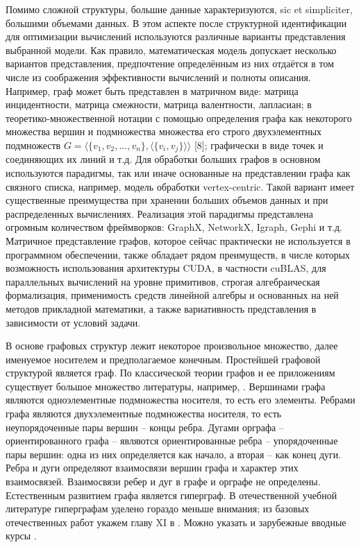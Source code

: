 Помимо сложной структуры, большие данные характеризуются, sic et simpliciter, большими объемами данных. В этом аспекте после структурной идентификации для оптимизации вычислений используются различные варианты представления выбранной модели. Как правило, математическая модель допускает несколько вариантов представления, предпочтение определённым из них отдаётся в том числе из соображения эффективности вычислений и полноты описания. Например, граф может быть представлен в матричном виде: матрица инцидентности, матрица смежности, матрица валентности, лапласиан; в теоретико-множественной нотации с помощью определения графа как некоторого множества вершин и подмножества множества его строго двухэлементных подмножеств $G=\big\langle \{v_1, v_2,...,v_n\},\langle \{v_i, v_j\} \rangle \big\rangle$ [8]; графически в виде точек и соединяющих их линий и т.д. Для обработки больших графов в основном используются парадигмы, так или иначе основанные на представлении графа как связного списка, например, модель обработки vertex-centric. Такой вариант имеет существенные преимущества при хранении больших объемов данных и при распределенных вычислениях. Реализация этой парадигмы представлена огромным количеством фреймворков: GraphX, NetworkX, Igraph, Gephi и т.д. Матричное представление графов, которое сейчас практически не используется в программном обеспечении, также обладает рядом преимуществ, в числе которых возможность использования архитектуры CUDA, в частности cuBLAS, для параллельных вычислений на уровне примитивов, строгая алгебраическая формализация, применимость средств линейной алгебры и основанных на ней методов прикладной математики, а также вариативность представления в зависимости от условий задачи.


В основе графовых структур лежит некоторое произвольное множество, далее именуемое носителем и предполагаемое конечным. Простейшей графовой структурой является граф. По классической теории графов и ее приложениям существует большое множество литературы, например, \cite{EmelichevGraphs, Kopilov2011, Knyazkov2016}. Вершинами графа являются одноэлементные подмножества носителя, то есть его элементы. Ребрами графа являются двухэлементные подмножества носителя, то есть неупорядоченные пары вершин -- концы ребра. Дугами орграфа -- ориентированного графа -- являются ориентированные ребра -- упорядоченные пары вершин: одна из них определяется как начало, а вторая -- как конец дуги. Ребра и дуги определяют взаимосвязи вершин графа и характер этих взаимосвязей. Взаимосвязи ребер и дуг в графе и орграфе не определены. Естественным развитием графа является гиперграф. В отечественной учебной литературе гиперграфам уделено гораздо меньше внимания; из базовых отечественных работ укажем главу XI в \cite{EmelichevGraphs}. Можно указать и зарубежные вводные курсы \cite{Voloshin, Bretto}.

